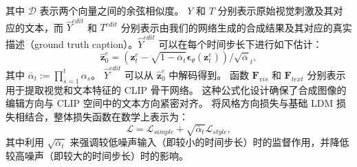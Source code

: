 其中 $\mathcal{D}$ 表示两个向量之间的余弦相似度。
$Y$ 和 $T$ 分别表示原始视觉刺激及其对应的文本，而 $\hat{Y}^{edit}$ 和 $T^{edit}$ 分别表示由我们的网络生成的合成结果及其对应的真实描述（ground truth caption）。$\hat{Y}^{edit}$ 可以在每个时间步长下进行如下估计：
\begin{equation}
\label{eq:decode_z}
    \hat{\textbf{z}}_0^e = (\textbf{z}_t^e - \sqrt{1-\overline{\alpha}_t} \bm{\epsilon}_{\theta} (\textbf{z}_t^e)) / \sqrt{\overline{\alpha}}_t,
\end{equation}
其中 $\overline{\alpha}_t := \prod_{s=1}^t \alpha_s$。
$\hat{Y}^{edit}$ 可以从 $\hat{\textbf{z}}_0^e$ 中解码得到。
函数 $\textbf{F}_{vis}$ 和 $\textbf{F}_{text}$ 分别表示用于提取视觉和文本特征的 CLIP 骨干网络。
这种公式化设计确保了合成图像的编辑方向与 CLIP 空间中的文本方向紧密对齐。
将风格方向损失与基础 LDM 损失相结合，整体损失函数在数学上表示为：
\begin{equation}
\mathcal{L}=\mathcal{L}_{simple}+\sqrt{\bar{\alpha}_t} \mathcal{L}_{style},
\end{equation}
其中利用 $\sqrt{\bar{\alpha}_t}$ 来强调较低噪声输入（即较小的时间步长）时的监督作用，并降低较高噪声（即较大的时间步长）时的影响。


